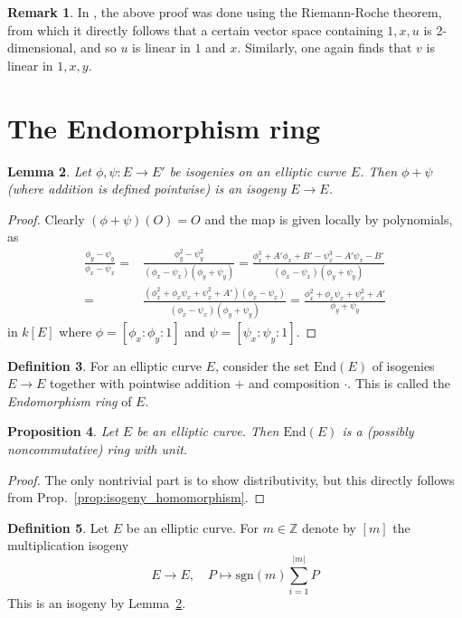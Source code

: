 \documentclass{scrartcl}
\newcommand{\Z}{\mathbb{Z}}
\newcommand{\End}{\mathrm{End}}
\renewcommand{\O}{O}
\newtheorem{prop}{Proposition}[section]
\newtheorem{lemma}[prop]{Lemma}
\theoremstyle{definition}
\newtheorem{definition}[prop]{Definition}
\newtheorem{remark}[prop]{Remark}
\begin{document}
\begin{remark}
    In \cite{EllipticCurves}, the above proof was done using the Riemann-Roche theorem, from which it directly follows that a certain vector space containing $1, x, u$ is 2-dimensional, and so $u$ is linear in $1$ and $x$.
    Similarly, one again finds that $v$ is linear in $1, x, y$. 
\end{remark}

\section{The Endomorphism ring}
\begin{lemma}
    \label{prop:sum_isogenies}
    Let $\phi, \psi: E \to E'$ be isogenies on an elliptic curve $E$.
    Then $\phi + \psi$ (where addition is defined pointwise) is an isogeny $E \to E$.
\end{lemma}
\begin{proof}
    Clearly $(\phi + \psi)(\O) = \O$ and the map is given locally by polynomials, as
    \begin{align*}
        \frac {\phi_y - \psi_y} {\phi_x - \psi_x} = &\frac {\phi_y^2 - \psi_y^2} {(\phi_x - \psi_x)(\phi_y + \psi_y)} = \frac {\phi_x^3 + A'\phi_x + B' - \psi_x^3 - A'\psi_x - B'} {(\phi_x - \psi_x)(\phi_y + \psi_y)} \\
        = &\frac {(\phi_x^2 + \phi_x \psi_x + \psi_x^2 + A')(\phi_x - \psi_x)} {(\phi_x - \psi_x)(\phi_y + \psi_y)} = \frac {\phi_x^2 + \phi_x \psi_x + \psi_x^2 + A'} {\phi_y + \psi_y}
    \end{align*}
    in $k[E]$ where $\phi = [\phi_x : \phi_y : 1]$ and $\psi = [\psi_x : \psi_y : 1]$.
\end{proof}
\begin{definition}
    For an elliptic curve $E$, consider the set $\End(E)$ of isogenies $E \to E$ together with pointwise addition $+$ and composition $\cdot$.
    This is called the \emph{Endomorphism ring} of $E$.
\end{definition}
\begin{prop}
    Let $E$ be an elliptic curve. 
    Then $\End(E)$ is a (possibly noncommutative) ring with unit.
\end{prop}
\begin{proof}
    The only nontrivial part is to show distributivity, but this directly follows from Prop.~\ref{prop:isogeny_homomorphism}.
\end{proof}
\begin{definition}
    Let $E$ be an elliptic curve.
    For $m \in \Z$ denote by $[m]$ the multiplication isogeny
    \begin{equation*}
        E \to E, \quad P \mapsto \mathrm{sgn}(m)\sum_{i = 1}^{|m|} P
    \end{equation*}
    This is an isogeny by Lemma~\ref{prop:sum_isogenies}.
\end{definition}
\end{document}
